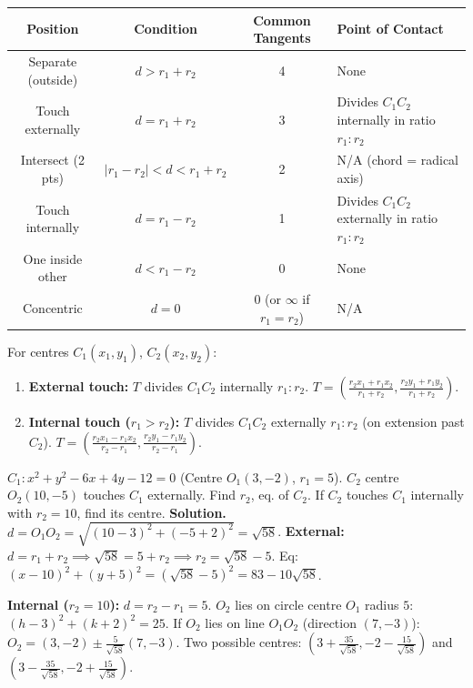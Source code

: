 \documentclass[11pt]{article}
\begin{document}
\begin{center}
\begin{tabular}{|c|c|c|l|}
\hline
\textbf{Position} & \textbf{Condition} & \textbf{Common Tangents} & \textbf{Point of Contact} \\
\hline
Separate (outside) & $d > r_1+r_2$ & 4 & None \\
Touch externally & $d = r_1+r_2$ & 3 & Divides $C_1C_2$ internally in ratio $r_1:r_2$ \\
Intersect (2 pts) & $|r_1-r_2| < d < r_1+r_2$ & 2 & N/A (chord = radical axis) \\
Touch internally & $d = r_1-r_2$ & 1 & Divides $C_1C_2$ externally in ratio $r_1:r_2$ \\
One inside other & $d < r_1-r_2$ & 0 & None \\
Concentric & $d=0$ & 0 (or $\infty$ if $r_1=r_2$) & N/A \\
\hline
\end{tabular}
\end{center}

\begin{methode}
For centres $C_1(x_1,y_1)$, $C_2(x_2,y_2)$:
\begin{enumerate}
\item \textbf{External touch:} $T$ divides $C_1C_2$ internally $r_1:r_2$.
$T = \left( \frac{r_2 x_1 + r_1 x_2}{r_1+r_2}, \frac{r_2 y_1 + r_1 y_2}{r_1+r_2} \right)$.
\item \textbf{Internal touch ($r_1>r_2$):} $T$ divides $C_1C_2$ externally $r_1:r_2$ (on extension past $C_2$).
$T = \left( \frac{r_2 x_1 - r_1 x_2}{r_2-r_1}, \frac{r_2 y_1 - r_1 y_2}{r_2-r_1} \right)$.
\end{enumerate}
\end{methode}

\begin{exoresolu}
$C_1: x^2+y^2-6x+4y-12=0$ (Centre $O_1(3,-2)$, $r_1=5$).
$C_2$ centre $O_2(10,-5)$ touches $C_1$ externally. Find $r_2$, eq. of $C_2$.
If $C_2$ touches $C_1$ internally with $r_2=10$, find its centre.
\tcblower
\textbf{Solution.}
$d = O_1O_2 = \sqrt{(10-3)^2+(-5+2)^2} = \sqrt{58}$.
\textbf{External:} $d = r_1+r_2 \implies \sqrt{58} = 5+r_2 \implies r_2 = \sqrt{58}-5$.
Eq: $(x-10)^2+(y+5)^2 = (\sqrt{58}-5)^2 = 83-10\sqrt{58}$.

\textbf{Internal ($r_2=10$):} $d = r_2-r_1 = 5$.
$O_2$ lies on circle centre $O_1$ radius $5$: $(h-3)^2+(k+2)^2=25$.
If $O_2$ lies on line $O_1O_2$ (direction $(7,-3)$):
$O_2 = (3,-2) \pm \frac{5}{\sqrt{58}}(7,-3)$.
Two possible centres: $\left(3+\frac{35}{\sqrt{58}}, -2-\frac{15}{\sqrt{58}}\right)$ and $\left(3-\frac{35}{\sqrt{58}}, -2+\frac{15}{\sqrt{58}}\right)$.
\end{exoresolu}
\end{document}
